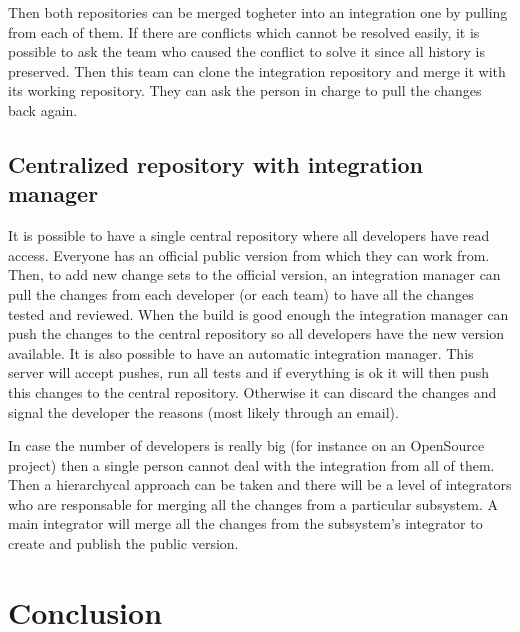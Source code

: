 \documentclass[%
	final,
	notitlepage,
	narroweqnarray,
	inline,
	twoside,
	]{ieee}
\begin{document}
Then both repositories can be merged togheter into an integration one by pulling from each of them. If there are conflicts which cannot be resolved easily, it is possible to ask the team who caused the conflict to solve it since all history is preserved. Then this team can clone the integration repository and merge it with its working repository. They can ask the person in charge to pull the changes back again.

\subsection{Centralized repository with integration manager}
It is possible to have a single central repository where all developers have read access. Everyone has an official public version from which they can work from. Then, to add new change sets to the official version, an integration manager can pull the changes from each developer (or each team) to have all the changes tested and reviewed. When the build is good enough the integration manager can push the changes to the central repository so all developers have the new version available.
It is also possible to have an automatic integration manager. This server will accept pushes, run all tests and if everything is ok it will then push this changes to the central repository. Otherwise it can discard the changes and signal the developer the reasons (most likely through an email).

In case the number of developers is really big (for instance on an OpenSource project) then a single person cannot deal with the integration from all of them. Then a hierarchycal approach can be taken and there will be a level of integrators who are responsable for merging all the changes from a particular subsystem. A main integrator will merge all the changes from the subsystem's integrator to create and publish the public version.




\section{Conclusion}
\end{document}
